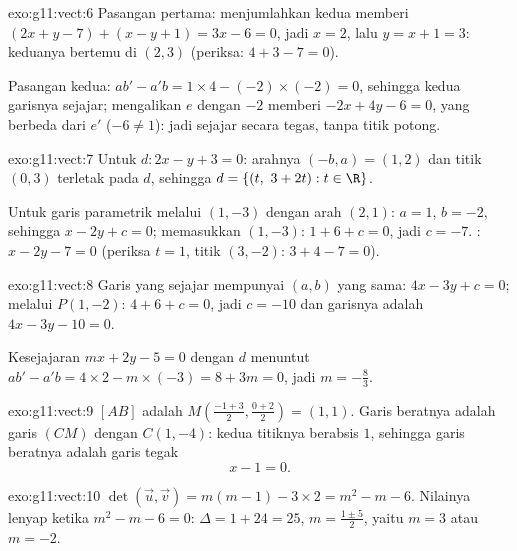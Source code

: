 \begin{solution}{exo:g11:vect:6}
Pasangan pertama: menjumlahkan kedua  memberi $(2x + y - 7) + (x - y + 1) =
3x - 6 = 0$, jadi $x = 2$, lalu $y = x + 1 = 3$: keduanya bertemu di $(2, 3)$
(periksa: $4 + 3 - 7 = 0$).

Pasangan kedua: $ab' - a'b = 1 \times 4 - (-2) \times (-2) = 0$, sehingga
kedua garisnya sejajar; mengalikan $e$ dengan $-2$ memberi $-2x + 4y - 6 = 0$,
yang berbeda dari $e'$ ($-6 \neq 1$): jadi sejajar secara tegas, tanpa
titik potong.
\end{solution}

\begin{solution}{exo:g11:vect:7}
Untuk $d: 2x - y + 3 = 0$: arahnya $(-b, a) = (1, 2)$ dan titik
$(0, 3)$ terletak pada $d$, sehingga $d = \{(t,\ 3 + 2t) : t \in \R\}$.

Untuk garis parametrik melalui $(1, -3)$ dengan arah $(2, 1)$:
$a = 1$, $b = -2$, sehingga $x - 2y + c = 0$; memasukkan $(1, -3)$:
$1 + 6 + c = 0$, jadi $c = -7$. : $x - 2y - 7 = 0$ (periksa $t = 1$,
titik $(3, -2)$: $3 + 4 - 7 = 0$).
\end{solution}

\begin{solution}{exo:g11:vect:8}
Garis yang sejajar mempunyai $(a, b)$ yang sama: $4x - 3y + c = 0$; melalui
$P(1, -2)$: $4 + 6 + c = 0$, jadi $c = -10$ dan garisnya adalah
$4x - 3y - 10 = 0$.

Kesejajaran $mx + 2y - 5 = 0$ dengan $d$ menuntut
$ab' - a'b = 4 \times 2 - m \times (-3) = 8 + 3m = 0$, jadi
$m = -\frac83$.
\end{solution}

\begin{solution}{exo:g11:vect:9}
 $[AB]$ adalah $M\!\left(\frac{-1+3}{2}, \frac{0+2}{2}\right)
= (1, 1)$. Garis beratnya adalah garis $(CM)$ dengan $C(1, -4)$: kedua titiknya
berabsis $1$, sehingga garis beratnya adalah garis tegak
\[
x - 1 = 0 .
\]
\end{solution}

\begin{solution}{exo:g11:vect:10}
$\det(\vec u, \vec v) = m(m - 1) - 3 \times 2 = m^2 - m - 6$. Nilainya lenyap
ketika $m^2 - m - 6 = 0$: $\Delta = 1 + 24 = 25$, 
$m = \frac{1 \pm 5}{2}$, yaitu $m = 3$ atau $m = -2$.
\end{solution}

